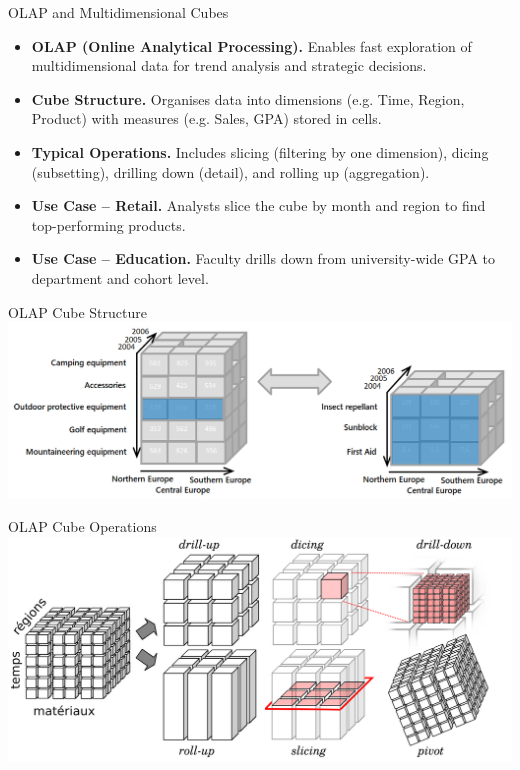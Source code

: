 \documentclass[aspectratio=169, table]{beamer}
\begin{document}
\begin{frame}{OLAP and Multidimensional Cubes}
	\vspace{20pt}
	\begin{itemize}
		\item \textbf{OLAP (Online Analytical Processing).} Enables fast exploration of multidimensional data for trend analysis and strategic decisions.
		\item \textbf{Cube Structure.} Organises data into dimensions (e.g. Time, Region, Product) with measures (e.g. Sales, GPA) stored in cells.
		\item \textbf{Typical Operations.} Includes slicing (filtering by one dimension), dicing (subsetting), drilling down (detail), and rolling up (aggregation).
		\item \textbf{Use Case – Retail.} Analysts slice the cube by month and region to find top-performing products.
		\item \textbf{Use Case – Education.} Faculty drills down from university-wide GPA to department and cohort level.
	\end{itemize}
\end{frame}


\begin{frame}{OLAP Cube Structure}
	\vspace{20pt}
	\centering
	\includegraphics[width=\textwidth]{figures/olap_structure.png}
\end{frame}

\begin{frame}{OLAP Cube Operations}
	\vspace{20pt}
	\centering
	\includegraphics[width=\textwidth]{figures/olap_operations.png}
\end{frame}
\end{document}
